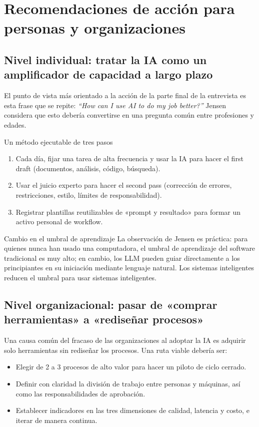 \section{Recomendaciones de acción para personas y organizaciones}

\subsection{Nivel individual: tratar la IA como un amplificador de capacidad a largo plazo}

El punto de vista más orientado a la acción de la parte final de la entrevista es esta frase que se repite: \textit{``How can I use AI to do my job better?''} Jensen considera que esto debería convertirse en una pregunta común entre profesiones y edades.

\begin{knowledgebox}{Un método ejecutable de tres pasos}
\begin{enumerate}
    \item Cada día, fijar una tarea de alta frecuencia y usar la IA para hacer el first draft (documentos, análisis, código, búsqueda).
    \item Usar el juicio experto para hacer el second pass (corrección de errores, restricciones, estilo, límites de responsabilidad).
    \item Registrar plantillas reutilizables de «prompt y resultado» para formar un activo personal de workflow.
\end{enumerate}
\end{knowledgebox}

\begin{importantbox}{Cambio en el umbral de aprendizaje}
La observación de Jensen es práctica: para quienes nunca han usado una computadora, el umbral de aprendizaje del software tradicional es muy alto; en cambio, los LLM pueden guiar directamente a los principiantes en su iniciación mediante lenguaje natural. Los sistemas inteligentes reducen el umbral para usar sistemas inteligentes.
\end{importantbox}

\subsection{Nivel organizacional: pasar de «comprar herramientas» a «rediseñar procesos»}

Una causa común del fracaso de las organizaciones al adoptar la IA es adquirir solo herramientas sin rediseñar los procesos. Una ruta viable debería ser:
\begin{itemize}
    \item Elegir de 2 a 3 procesos de alto valor para hacer un piloto de ciclo cerrado.
    \item Definir con claridad la división de trabajo entre personas y máquinas, así como las responsabilidades de aprobación.
    \item Establecer indicadores en las tres dimensiones de calidad, latencia y costo, e iterar de manera continua.
\end{itemize}


